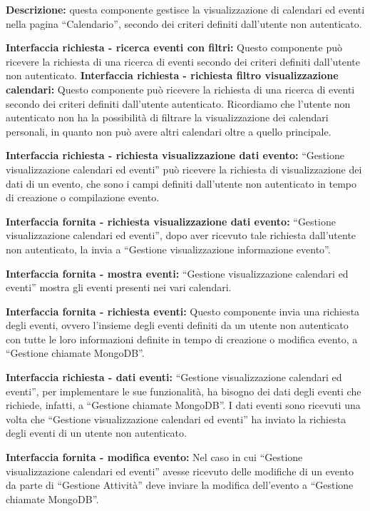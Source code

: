 \begin{listaPersonale}[]{}

    \textbf{Descrizione:} questa componente gestisce la visualizzazione di calendari ed eventi nella pagina “Calendario”, secondo dei criteri definiti dall'utente non autenticato.

    \textbf{Interfaccia richiesta - ricerca eventi con filtri:} Questo componente può ricevere la richiesta di una ricerca di eventi secondo dei criteri definiti dall'utente non autenticato.
    \textbf{Interfaccia richiesta - richiesta filtro visualizzazione
        calendari:}  Questo componente può ricevere la richiesta di una ricerca di eventi secondo dei criteri definiti dall'utente autenticato. Ricordiamo che l'utente non autenticato non ha la possibilità di filtrare la visualizzazione dei calendari personali, in quanto non può avere altri calendari oltre a quello principale.

    \textbf{Interfaccia richiesta - richiesta visualizzazione dati evento:} “Gestione visualizzazione calendari ed eventi” può ricevere la richiesta di visualizzazione dei dati di un evento, che sono i campi definiti dall'utente non autenticato in tempo di creazione o compilazione evento.

    \textbf{Interfaccia fornita - richiesta visualizzazione dati evento:}  “Gestione visualizzazione calendari ed eventi”, dopo aver ricevuto tale richiesta dall'utente non autenticato, la invia a “Gestione visualizzazione informazione evento”.

    \textbf{Interfaccia fornita - mostra eventi:} “Gestione visualizzazione calendari ed eventi” mostra gli eventi presenti nei vari calendari.

    \textbf{Interfaccia fornita - richiesta eventi:} Questo componente invia una richiesta degli eventi, ovvero l'insieme degli eventi definiti da un utente non autenticato con tutte le loro informazioni definite in tempo di creazione o modifica evento, a “Gestione chiamate MongoDB”.

    \textbf{Interfaccia richiesta - dati eventi:} “Gestione visualizzazione calendari ed eventi”, per implementare le sue funzionalità, ha bisogno dei dati degli eventi che richiede, infatti, a “Gestione chiamate MongoDB”. I dati eventi sono ricevuti una volta che “Gestione visualizzazione calendari ed eventi” ha inviato la richiesta degli eventi di un utente non autenticato.

    \textbf{Interfaccia fornita - modifica evento:} Nel caso in cui “Gestione visualizzazione calendari ed eventi” avesse ricevuto delle modifiche di un evento da parte di “Gestione Attività” deve inviare la modifica dell'evento a “Gestione chiamate MongoDB”.


\end{listaPersonale}
